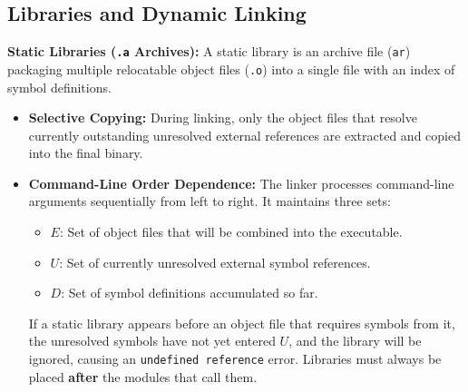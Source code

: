 \subsection{Libraries and Dynamic Linking}

\begin{definition}
    \textbf{Static Libraries (\texttt{.a} Archives):} A static library is an archive file (\texttt{ar}) packaging multiple relocatable object files (\texttt{.o}) into a single file with an index of symbol definitions.
    \begin{itemize}
        \item \textbf{Selective Copying:} During linking, only the object files that resolve currently outstanding unresolved external references are extracted and copied into the final binary.
        \item \textbf{Command-Line Order Dependence:} The linker processes command-line arguments sequentially from left to right. It maintains three sets:
        \begin{itemize}
            \item $E$: Set of object files that will be combined into the executable.
            \item $U$: Set of currently unresolved external symbol references.
            \item $D$: Set of symbol definitions accumulated so far.
        \end{itemize}
        If a static library appears before an object file that requires symbols from it, the unresolved symbols have not yet entered $U$, and the library will be ignored, causing an \texttt{undefined reference} error. Libraries must always be placed \textbf{after} the modules that call them.
    \end{itemize}
\end{definition}

